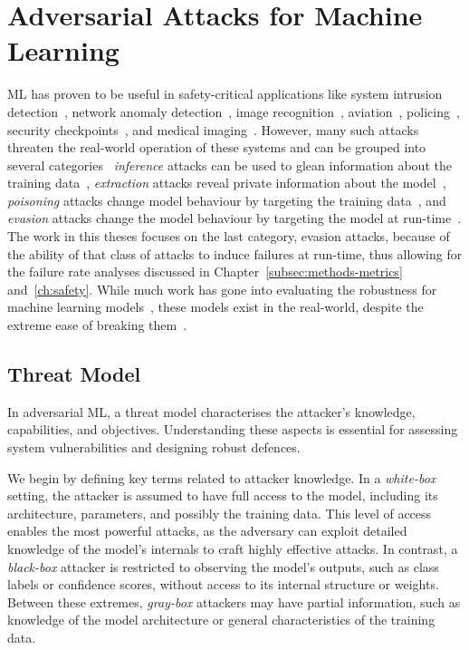 \section{Adversarial Attacks for Machine Learning}
\label{sec:attacks}
ML has proven to be useful in safety-critical applications like system intrusion detection~\cite{kim2003network}, network anomaly detection~\cite{mehmood2015svm}, image recognition~\cite{tzotsos2008support}, aviation~\cite{ai_aviation}, policing~\cite{ai_prison}, security checkpoints~\cite{ai_security}, and medical imaging~\cite{ai_medical_imaging}. 
However, many such attacks threaten the real-world operation of these systems and can be grouped into several categories~\cite{art2018} \textit{inference} attacks can be used to glean information about the training data~\cite{li2021membership,shokri2017membership,choquette2021label}, \textit{extraction} attacks reveal private information about the model~\cite{extraction_attack}, \textit{poisoning} attacks change model behaviour by targeting the training data~\cite{shafahi2018poison,biggio2012poisoning,biggio_poisoning_2013}, and \textit{evasion} attacks change the model behaviour by targeting the model at run-time~\cite{carlini_towards_2017,carlini2019evaluating,deepfool,hopskipjump,pixelattack,chen2017zoo}. 
The work in this theses focuses on the last category, evasion attacks, because of the ability of that class of attacks to induce failures at run-time, thus allowing for the failure rate analyses discussed in Chapter~\ref{subsec:methods-metrics} and~\ref{ch:safety}. 
While much work has gone into evaluating the robustness for machine learning models~\cite{deepfool,biggio_evasion_2013,carlini_towards_2017,deka2019adversarial}, these models exist in the real-world, despite the extreme ease of breaking them~\cite{meyers2023safety,biggio_evasion_2013,carlini_towards_2017,trashfire}. 


\subsection{Threat Model}
\label{subsec:threat_model}
In adversarial ML, a threat model characterises the attacker’s knowledge, capabilities, and objectives. Understanding these aspects is essential for assessing system vulnerabilities and designing robust defences.

We begin by defining key terms related to attacker knowledge. 
In a \textit{white-box} setting, the attacker is assumed to have full access to the model, including its architecture, parameters, and possibly the training data. 
This level of access enables the most powerful attacks, as the adversary can exploit detailed knowledge of the model's internals to craft highly effective attacks. 
In contrast, a \textit{black-box} attacker is restricted to observing the model's outputs, such as class labels or confidence scores, without access to its internal structure or weights. 
Between these extremes, \textit{gray-box} attackers may have partial information, such as knowledge of the model architecture or general characteristics of the training data.

